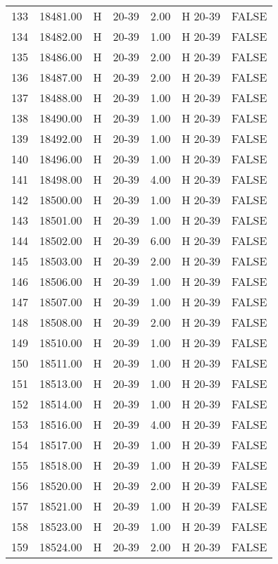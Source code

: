 \begin{table}[ht]
\begin{tabular}{rrllrll}
  133 & 18481.00 & H & 20-39 & 2.00 & H 20-39 & FALSE \\ 
  134 & 18482.00 & H & 20-39 & 1.00 & H 20-39 & FALSE \\ 
  135 & 18486.00 & H & 20-39 & 2.00 & H 20-39 & FALSE \\ 
  136 & 18487.00 & H & 20-39 & 2.00 & H 20-39 & FALSE \\ 
  137 & 18488.00 & H & 20-39 & 1.00 & H 20-39 & FALSE \\ 
  138 & 18490.00 & H & 20-39 & 1.00 & H 20-39 & FALSE \\ 
  139 & 18492.00 & H & 20-39 & 1.00 & H 20-39 & FALSE \\ 
  140 & 18496.00 & H & 20-39 & 1.00 & H 20-39 & FALSE \\ 
  141 & 18498.00 & H & 20-39 & 4.00 & H 20-39 & FALSE \\ 
  142 & 18500.00 & H & 20-39 & 1.00 & H 20-39 & FALSE \\ 
  143 & 18501.00 & H & 20-39 & 1.00 & H 20-39 & FALSE \\ 
  144 & 18502.00 & H & 20-39 & 6.00 & H 20-39 & FALSE \\ 
  145 & 18503.00 & H & 20-39 & 2.00 & H 20-39 & FALSE \\ 
  146 & 18506.00 & H & 20-39 & 1.00 & H 20-39 & FALSE \\ 
  147 & 18507.00 & H & 20-39 & 1.00 & H 20-39 & FALSE \\ 
  148 & 18508.00 & H & 20-39 & 2.00 & H 20-39 & FALSE \\ 
  149 & 18510.00 & H & 20-39 & 1.00 & H 20-39 & FALSE \\ 
  150 & 18511.00 & H & 20-39 & 1.00 & H 20-39 & FALSE \\ 
  151 & 18513.00 & H & 20-39 & 1.00 & H 20-39 & FALSE \\ 
  152 & 18514.00 & H & 20-39 & 1.00 & H 20-39 & FALSE \\ 
  153 & 18516.00 & H & 20-39 & 4.00 & H 20-39 & FALSE \\ 
  154 & 18517.00 & H & 20-39 & 1.00 & H 20-39 & FALSE \\ 
  155 & 18518.00 & H & 20-39 & 1.00 & H 20-39 & FALSE \\ 
  156 & 18520.00 & H & 20-39 & 2.00 & H 20-39 & FALSE \\ 
  157 & 18521.00 & H & 20-39 & 1.00 & H 20-39 & FALSE \\ 
  158 & 18523.00 & H & 20-39 & 1.00 & H 20-39 & FALSE \\ 
  159 & 18524.00 & H & 20-39 & 2.00 & H 20-39 & FALSE \\ 

\end{tabular}
\end{table}
